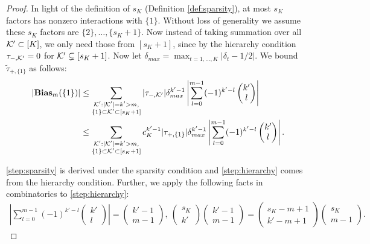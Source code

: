 \documentclass[12pt]{article}
\begin{document}
\begin{proof}
In light of the definition of $s_K$ (Definition \ref{def:sparsity}), at most $s_K$ factors has nonzero interactions with $\{1\}$. Without loss of generality we assume these $s_K$ factors are $\{2\}, \dots, \{s_K+1\}$. Now instead of taking summation over all ${\mathcal{K}}'\subset [K]$, we only need those from $[s_K+1]$, since by the hierarchy condition  $\tau_{-,{\mathcal{K}}'}=0$ for ${\mathcal{K}}'\subsetneq [s_K+1]$. Now let $\delta_{max}=\max_{t=1,\dots, K} |\delta_t-1/2|$. We bound $\tilde{\tau}_{+,\{1\}}$ as follows:
\begin{align}
    |\text{\textbf{Bias}}_m(\{1\})| &\le \sum_{\substack{{\mathcal{K}}':|{\mathcal{K}}'|=k'>m, \\ \{1\}\subset {\mathcal{K}}'\subset [s_K+1]}} |\tau_{-,{\mathcal{K}}'}| \delta_{max}^{k'-1} \left|\sum_{l=0}^{m-1} (-1)^{k'-l} \begin{pmatrix}
    k' \\
    l
    \end{pmatrix}
    \right| \label{step:sparsity}\\
    &\le\sum_{\substack{{\mathcal{K}}':|{\mathcal{K}}'|=k'>m, \\ \{1\}\subset {\mathcal{K}}'\subset [s_K+1]}} c_K^{k'-1}|\tau_{+,\{1\}}| \delta_{max}^{k'-1} \left|\sum_{l=0}^{m-1} (-1)^{k'-l} \begin{pmatrix}
    k' \\
    l
    \end{pmatrix}\right|.\label{step:hierarchy}
    \end{align}
    
    \eqref{step:sparsity} is derived under the sparsity condition and \eqref{step:hierarchy} comes from the hierarchy condition. Further, we apply the following facts in combinatorics to \eqref{step:hierarchy}:
    \begin{align*}
        \left|\sum_{l=0}^{m-1} (-1)^{k'-l} \begin{pmatrix}
    k' \\
    l
    \end{pmatrix}\right|= 
    \begin{pmatrix}
    k'-1 \\
    m-1
    \end{pmatrix}
    , ~
    \begin{pmatrix}
    s_K\\
    k'
    \end{pmatrix}
    \begin{pmatrix}
    k'-1 \\
    m-1
    \end{pmatrix}
    =
    \begin{pmatrix}
    s_K-m+1\\
    k'-m+1
    \end{pmatrix}
    \begin{pmatrix}
    s_K \\
    m-1
    \end{pmatrix}.
    \end{align*}
    

\end{proof}
\end{document}
